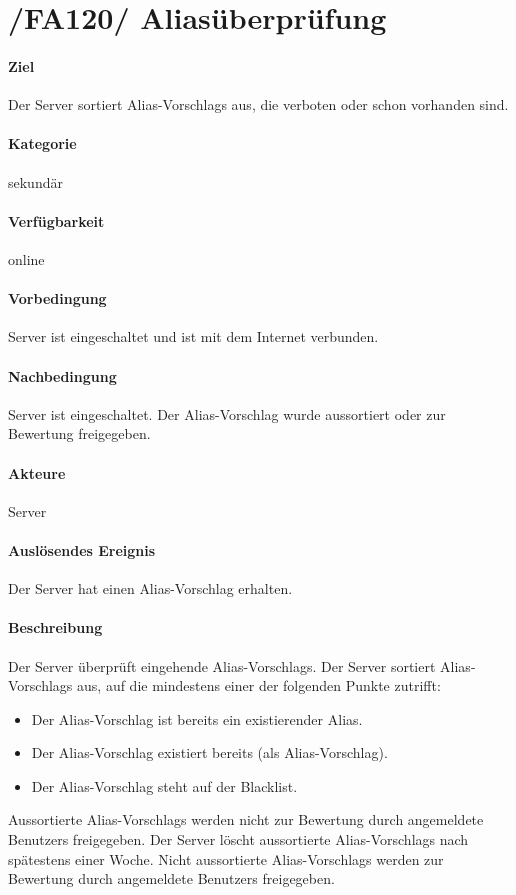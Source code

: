 \section[Aliasüberprüfung]{/FA120/ Aliasüberprüfung}
\label{/FA120/}
\paragraph{Ziel}
Der \Gls{Server} sortiert \Glspl{Alias-Vorschlag} aus, die verboten oder schon vorhanden sind.
\paragraph{Kategorie}
sekundär
\paragraph{Verfügbarkeit}
online
\paragraph{Vorbedingung}
\Gls{Server} ist eingeschaltet und ist mit dem Internet verbunden.
\paragraph{Nachbedingung}
\Gls{Server} ist eingeschaltet. Der \Gls{Alias-Vorschlag} wurde aussortiert oder zur Bewertung freigegeben.
\paragraph{Akteure}
\Gls{Server}
\paragraph{Auslösendes Ereignis}
Der \Gls{Server} hat einen \Gls{Alias-Vorschlag} erhalten.
\paragraph{Beschreibung}
Der \Gls{Server} überprüft eingehende \Glspl{Alias-Vorschlag}. Der \Gls{Server} sortiert \Glspl{Alias-Vorschlag} aus, auf die mindestens einer der folgenden Punkte zutrifft:
\begin{itemize}
    \item Der \Gls{Alias-Vorschlag} ist bereits ein existierender \Gls{Alias}.
    \item Der \Gls{Alias-Vorschlag} existiert bereits (als \Gls{Alias-Vorschlag}).
    \item Der \Gls{Alias-Vorschlag} steht auf der \Gls{Blacklist}.
\end{itemize}
Aussortierte \Glspl{Alias-Vorschlag} werden nicht zur Bewertung durch angemeldete \Glspl{Benutzer} freigegeben. Der \Gls{Server} löscht aussortierte \Glspl{Alias-Vorschlag} nach spätestens einer Woche. Nicht aussortierte \Glspl{Alias-Vorschlag} werden zur Bewertung durch angemeldete \Glspl{Benutzer} freigegeben.
